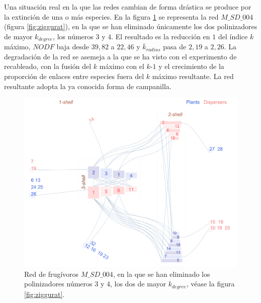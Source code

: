 Una situación real en la que las redes cambian de forma drástica se produce por la extinción de una o más especies. En la figura \ref{fig:VIS_M_SD_004_pol3_pol4_ziggurat} se representa la red $M\_SD\_004$ (figura \ref{fig:ziggurat}), en la que se han eliminado únicamente los dos polinizadores de mayor $k_{degree}$, los números $3$ y $4$. El resultado es la reducción en $1$ del índice $k$ máximo, $NODF$ baja desde $39,82$ a $22,46$ y $\overline k_{radius}$ pasa de $2,19$ a $2,26$. La degradación de la red se asemeja a la que se ha visto con el experimento de recableado, con la fusión del $k$ máximo con el $k$-$1$ y el crecimiento de la proporción de enlaces entre especies fuera del $k$ máximo resultante. La red resultante adopta la ya conocida forma de campanilla.

\begin{figure}[ht!]
\centering
\includegraphics[scale=0.5]{Figures/VIS_M_SD_004_pol3_pol4_ziggurat.png}
\caption {Red de frugívoros $M\_SD\_004$, en la que se han eliminado los polinizadores números $3$ y $4$, los dos de mayor $k_{degree}$, véase la figura \ref{fig:ziggurat}.} 
\label{fig:VIS_M_SD_004_pol3_pol4_ziggurat}
\end{figure}

